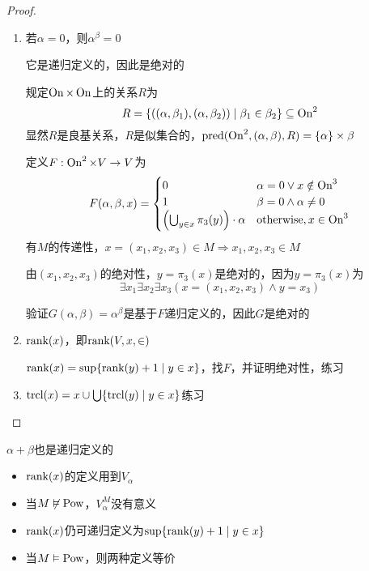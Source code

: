 \documentclass[11pt]{article}
\begin{document}
\begin{proof}
\begin{enumerate}
\item 若\(\alpha=0\)，则\(\alpha^\beta=0\)

它是递归定义的，因此是绝对的

规定\(\operatorname{On}\times\operatorname{On}\)上的关系\(R\)为
\begin{equation*}
R=\{((\alpha,\beta_1),(\alpha,\beta_2))\mid\beta_1\in\beta_2\}\subseteq\operatorname{On}^2
\end{equation*}
显然\(R\)是良基关系，\(R\)是似集合的，\(\text{pred}(\operatorname{On}^2,(\alpha,\beta),R)=\{\alpha\}\times\beta\)

定义\(F:\operatorname{On}^2\times V\to V\)为
\begin{equation*}
F(\alpha,\beta,x)=
\begin{cases}
0&\alpha=0\vee x\notin\operatorname{On}^3\\
1&\beta=0\wedge\alpha\neq 0\\
\left( \bigcup_{y\in x}\pi_3(y) \right)\cdot\alpha&\text{otherwise},x\in\operatorname{On}^3
\end{cases}
\end{equation*}
有\(M\)的传递性，\(x=(x_1,x_2,x_3)\in M\Rightarrow x_1,x_2,x_3\in M\)

由\((x_1,x_2,x_3)\)的绝对性，\(y=\pi_3(x)\)是绝对的，因为\(y=\pi_3(x)\)为
\begin{equation*}
\exists x_1\exists x_2\exists x_3(x=(x_1,x_2,x_3)\wedge y=x_3)
\end{equation*}

验证\(G(\alpha,\beta)=\alpha^\beta\)是基于\(F\)递归定义的，因此\(G\)是绝对的

\item \(\text{rank}(x)\)，即\(\text{rank}(V,x,\in)\)

\(\text{rank}(x)=\sup\{\text{rank}(y)+1\mid y\in x\}\)，找\(F\)，并证明绝对性，练习

\item \(\operatorname{\text{trcl}}(x)=x\cup\bigcup\{\operatorname{\text{trcl}}(y)\mid y\in x\}\)练习
\end{enumerate}
\end{proof}

\begin{remark}
\(\alpha+\beta\)也是递归定义的
\end{remark}

\begin{remark}
\begin{itemize}
\item \(\text{rank}(x)\)的定义用到\(V_\alpha\)
\item 当\(M\not\vDash\operatorname{Pow}\)，\(V_\alpha^M\)没有意义
\item \(\text{rank}(x)\)仍可递归定义为\(\sup\{\text{rank}(y)+1\mid y\in x\}\)
\item 当\(M\vDash\operatorname{Pow}\)，则两种定义等价
\end{itemize}
\end{remark}
\end{document}
